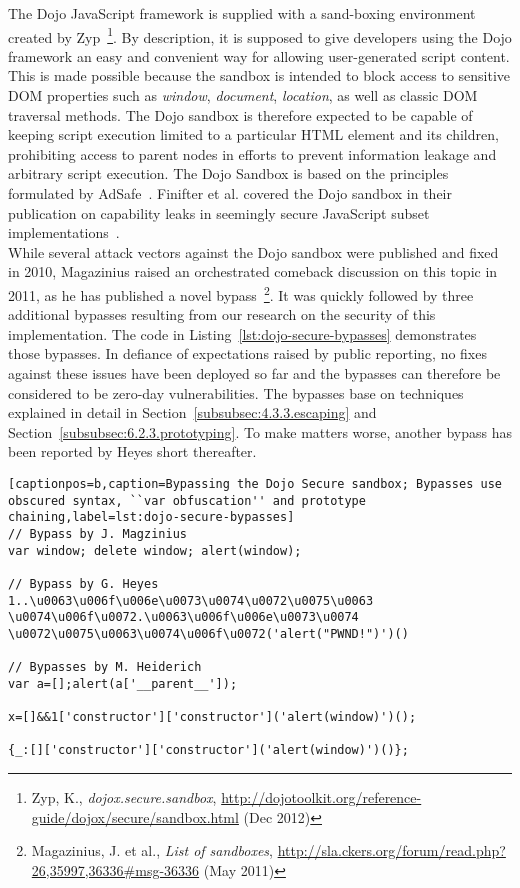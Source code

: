     The Dojo JavaScript framework is supplied with a sand-boxing environment created by Zyp~\footnote{Zyp, K., \textit{dojox.secure.sandbox}, \url{http://dojotoolkit.org/reference-guide/dojox/secure/sandbox.html} (Dec 2012)}. By description, it is supposed to give developers using the Dojo framework an easy and convenient way for allowing user-generated script content. This is made possible because the sandbox is intended to block access to sensitive DOM properties such as \textit{window}, \textit{document}, \textit{location}, as well as classic DOM traversal methods. The Dojo sandbox is therefore expected to be capable of keeping script execution limited to a particular HTML element and its children, prohibiting access to parent nodes in efforts to prevent information leakage and arbitrary script execution. The Dojo Sandbox is based on the principles formulated by AdSafe~\cite{crockford2008adsafe}. Finifter et al. covered the Dojo sandbox in their publication on capability leaks in seemingly secure 
JavaScript subset implementations~\cite{finifter2010preventing}. \\

    While several attack vectors against the Dojo sandbox were published and fixed in 2010, Magazinius raised an orchestrated comeback discussion on this topic in 2011, as he has published a novel bypass~\footnote{Magazinius, J. et al., \textit{List of sandboxes}, \url{http://sla.ckers.org/forum/read.php?26,35997,36336#msg-36336} (May 2011)}. It was quickly followed by three additional bypasses resulting from our research on the security of this implementation. The code in Listing~\ref{lst:dojo-secure-bypasses} demonstrates those bypasses. In defiance of expectations raised by public reporting, no fixes against these issues have been deployed so far and the bypasses can therefore be considered to be zero-day vulnerabilities. The bypasses base on techniques explained in detail in Section~\ref{subsubsec:4.3.3.escaping} and Section~\ref{subsubsec:6.2.3.prototyping}. To make matters worse, another bypass has been reported by Heyes short thereafter.

\begin{lstlisting}[captionpos=b,caption=Bypassing the Dojo Secure sandbox; Bypasses use obscured syntax, ``var obfuscation'' and prototype chaining,label=lst:dojo-secure-bypasses]
// Bypass by J. Magzinius
var window; delete window; alert(window); 

// Bypass by G. Heyes
1..\u0063\u006f\u006e\u0073\u0074\u0072\u0075\u0063
\u0074\u006f\u0072.\u0063\u006f\u006e\u0073\u0074
\u0072\u0075\u0063\u0074\u006f\u0072('alert("PWND!")')()

// Bypasses by M. Heiderich
var a=[];alert(a['__parent__']);

x=[]&&1['constructor']['constructor']('alert(window)')();

{_:[]['constructor']['constructor']('alert(window)')()};
\end{lstlisting}
    
